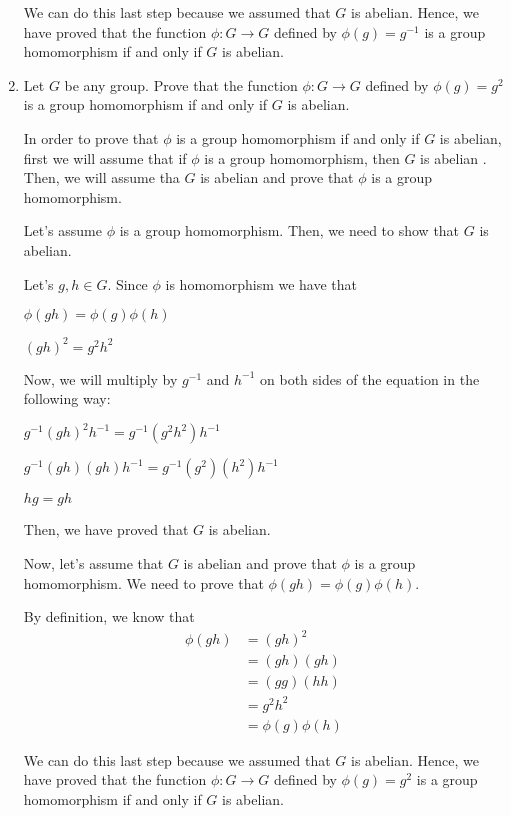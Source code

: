 \documentclass[11pt]{article}
\begin{document}
\begin{enumerate}
We can do this last step because we assumed that $G$ is abelian. Hence, we have proved that the function $\phi: G \rightarrow G$ defined by 
$\phi(g) = g^{-1}$ is a group homomorphism if and only if $G$ is abelian. 


\vspace{.2in}


\item Let $G$ be any group. Prove that the function $\phi: G \rightarrow G$ defined by 
$\phi(g) = g^{2}$ is a group homomorphism if and only if $G$ is abelian.

In order to prove that $\phi$ is a group homomorphism if and only if $G$ is abelian, first we will assume that if $\phi$ is a group homomorphism, then $G$ is abelian . Then, we will assume tha $G$ is abelian and prove that $\phi$ is a group homomorphism.

Let's assume $\phi$ is a group homomorphism. Then, we need to show that $G$ is abelian. 

Let's $g,h\in G $. Since $\phi$ is homomorphism we have that 

\begin{center}
$\phi(gh)=\phi(g)\phi(h)$
\end{center}

\begin{center}
$(gh)^{2}=g^{2}h^{2}$
\end{center}

Now, we will multiply by $g^{-1}$ and $h^{-1}$ on both sides of the equation in the following way:

\begin{center}
$g^{-1}(gh)^{2}h^{-1}=g^{-1}(g^{2}h^{2})h^{-1}$
\end{center}
\begin{center}
$g^{-1}(gh)(gh)h^{-1}=g^{-1}(g^{2})(h^{2})h^{-1}$
\end{center}
\begin{center}
$hg=gh$
\end{center}

Then, we have proved that $G$ is abelian. 


Now, let's assume that $G$ is abelian and prove that $\phi$ is a group homomorphism. We need to prove that $\phi(gh)=\phi(g)\phi(h)$.

By definition, we know that 
\begin{equation}
  \begin{aligned}
    \phi(gh) &=(gh)^{2}\\ 
    & = (gh)(gh) \\
    & =(gg)(hh)\\ 
    & =g^2h^2\\
    & =\phi(g)\phi(h)
    \end{aligned}
\end{equation}

We can do this last step because we assumed that $G$ is abelian. Hence, we have proved that the function $\phi: G \rightarrow G$ defined by 
$\phi(g) = g^{2}$ is a group homomorphism if and only if $G$ is abelian. 

\end{enumerate}
\end{document}
